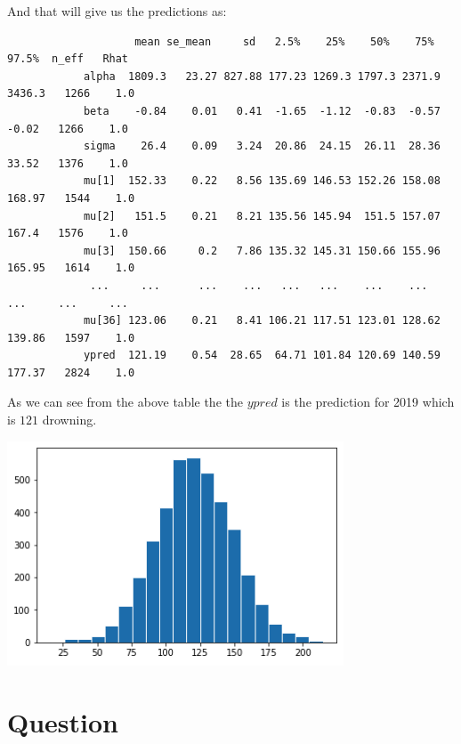 \documentclass[11pt,a4paper,english]{article}
\begin{document}
          And that will give us the predictions as:
          \begin{verbatim}
                    mean se_mean     sd   2.5%    25%    50%    75%  97.5%  n_eff   Rhat
            alpha  1809.3   23.27 827.88 177.23 1269.3 1797.3 2371.9 3436.3   1266    1.0
            beta    -0.84    0.01   0.41  -1.65  -1.12  -0.83  -0.57  -0.02   1266    1.0
            sigma    26.4    0.09   3.24  20.86  24.15  26.11  28.36  33.52   1376    1.0
            mu[1]  152.33    0.22   8.56 135.69 146.53 152.26 158.08 168.97   1544    1.0
            mu[2]   151.5    0.21   8.21 135.56 145.94  151.5 157.07  167.4   1576    1.0
            mu[3]  150.66     0.2   7.86 135.32 145.31 150.66 155.96 165.95   1614    1.0
             ...     ...      ...    ...   ...   ...    ...    ...    ...     ...     ...
            mu[36] 123.06    0.21   8.41 106.21 117.51 123.01 128.62 139.86   1597    1.0
            ypred  121.19    0.54  28.65  64.71 101.84 120.69 140.59 177.37   2824    1.0
          \end{verbatim}
          As we can see from the above table the the $ypred$ is the prediction for 2019 which is $121$ drowning.
          \begin{center}
            \includegraphics[width=10cm]{drowning_y_prediction.png}
          \end{center}

      \section{Question}
\end{document}
